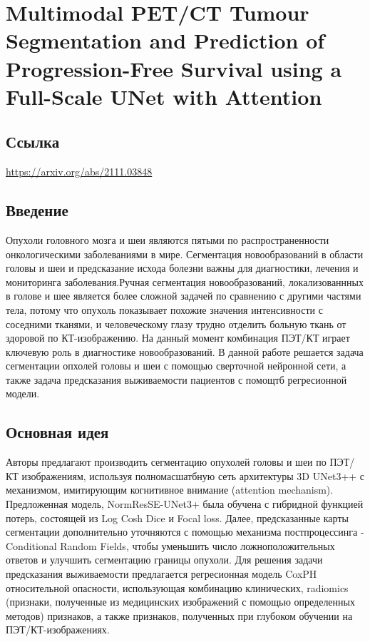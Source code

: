 \section{Multimodal PET/CT Tumour
Segmentation and Prediction of
Progression-Free Survival using a
Full-Scale UNet with Attention}

\subsection*{Ссылка} \url{https://arxiv.org/abs/2111.03848}
\subsection*{Введение}
Опухоли головного мозга и шеи являются пятыми по распространенности 
онкологическими заболеваниями в мире. Сегментация новообразований 
в области головы и шеи и предсказание исхода болезни важны 
для диагностики, лечения и мониторинга заболевания.Ручная сегментация
новообразований, локализованнных в голове и шее является более сложной задачей по 
сравнению с другими частями тела, потому что опухоль показывает похожие 
значения интенсивности с соседними тканями, и человеческому глазу трудно отделить 
больную ткань от здоровой по КТ-изображению. На данный момент комбинация ПЭТ/КТ 
играет ключевую роль в диагностике новообразований. В данной работе
решается задача сегментации опхолей головы и шеи с помощью 
сверточной нейронной сети, а также задача предсказания выживаемости пациентов с помощтб 
регресионной модели.
\subsection*{Основная идея}
Авторы предлагают производить сегментацию опухолей головы и шеи по ПЭТ/КТ 
изображениям, используя полномасшатбную сеть архитектуры 3D UNet3++ с механизмом,
имитирующим когнитивное внимание (attention mechanism).  Предложенная модель, 
NormResSE-UNet3+ была обучена с гибридной функцией потерь, состоящей из Log Cosh Dice и Focal loss. 
Далее, предсказанные карты сегментации дополнительно уточняются с помощью механизма постпроцессинга -
Conditional Random Fields, чтобы уменьшить число ложноположительных ответов 
и улучшить сегментацию границы опухоли. Для решения задачи предсказания 
выживаемости предлагается регресионная модель CoxPH относительной опасности, использующая 
комбинацию клинических, radiomics (признаки, полученные из медицинских изображений с помощью определенных методов) признаков, а также признаков, полученных при глубоком обучении на ПЭТ/КТ-изображениях.
